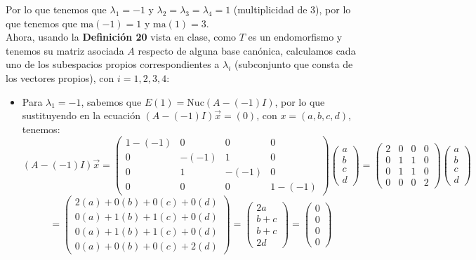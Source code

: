 \begin{itemize}
    Por lo que tenemos que $\lambda_1=-1$ y $\lambda_2=\lambda_3=\lambda_4=1$ (multiplicidad de 3), por lo que tenemos que $\text{ma}(-1)=1$ y $\text{ma}(1)=3$.\\
    Ahora, usando la \textbf{Definici\'on 20} vista en clase, como $T$ es un endomorfismo y tenemos su matriz asociada $A$ respecto de alguna base can\'onica, calculamos cada uno de los subespacios propios correspondientes a $\lambda_i$ (subconjunto que consta de los vectores
propios), con $i=1,2,3,4$:
\begin{itemize}
    \item Para $\lambda_1=-1$, sabemos que $E(1)=\text{Nuc}(A-(-1)I)$, por lo que sustituyendo en la ecuaci\'on $(A-(-1)I)\vec{x}=(0)$, con $x=(a,b,c,d)$, tenemos:
    \[(A-(-1)I)\vec{x}=\begin{pmatrix}
    1-(-1) & 0 & 0 & 0\\
    0 & -(-1) & 1 & 0\\
    0 & 1 & -(-1) & 0\\
    0 & 0 & 0 & 1-(-1)\end{pmatrix}\begin{pmatrix}a\\b\\c\\d\end{pmatrix}=\begin{pmatrix}
    2 & 0 & 0 & 0\\
    0 & 1 & 1 & 0\\
    0 & 1 & 1 & 0\\
    0 & 0 & 0 & 2\end{pmatrix}\begin{pmatrix}a\\b\\c\\d\end{pmatrix}\]\[=\begin{pmatrix}2(a)+0(b)+0(c)+0(d)\\0(a)+1(b)+1(c)+0(d)\\0(a)+1(b)+1(c)+0(d)\\0(a)+0(b)+0(c)+2(d)\end{pmatrix}=\begin{pmatrix}2a\\b+c\\b+c\\2d\end{pmatrix}=\begin{pmatrix}0\\0\\0\\0\end{pmatrix}\]

\end{itemize}
\end{itemize}
